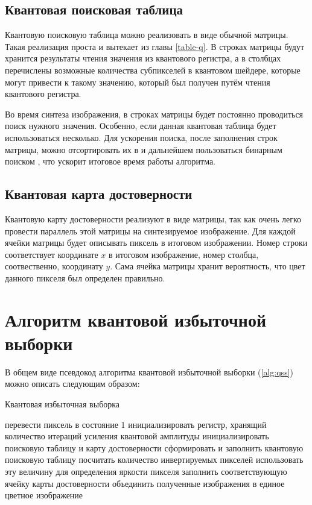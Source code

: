 \subsection{Квантовая поисковая таблица}

Квантовую поисковую таблица можно реализовать в виде обычной матрицы. Такая реализация проста и вытекает из главы \ref{table-q}. В строках матрицы будут хранится результаты чтения значения из квантового регистра, а в столбцах перечислены возможные количества субпикселей в квантовом шейдере, которые могут привести к такому значению, который был получен путём чтения квантового регистра. 

Во время синтеза изображения, в строках матрицы будет постоянно проводиться поиск нужного значения. Особенно, если данная квантовая таблица будет использоваться несколько. Для ускорения поиска, после заполнения строк матрицы, можно отсортировать их в и дальнейшем пользоваться бинарным поиском \cite{binary-search}, что ускорит итоговое время работы алгоритма.

\subsection{Квантовая карта достоверности}

Квантовую карту достоверности реализуют в виде матрицы, так как очень легко провести параллель этой матрицы на синтезируемое изображение. Для каждой ячейки матрицы будет описывать пиксель в итоговом изображении. Номер строки соответствует координате $x$ в итоговом изображение, номер столбца, соотвественно, координату $y$. Сама ячейка матрицы хранит вероятность, что цвет данного пикселя был определен правильно.

\section{Алгоритм квантовой избыточной выборки}\label{qss-algo}

В общем виде псевдокод алгоритма квантовой избыточной выборки (\ref{alg:qss}) можно описать следующим образом:

\begin{algorithm}
	\caption{Квантовая избыточная выборка}
	\label{alg:qss}
	\begin{algorithmic}[1]
				\State перевести пиксель в состояние 1
			\EndFor
			\State инициализировать регистр, хранящий количество итераций усиления квантовой амплитуды
			\State инициализировать поисковую таблицу и карту достоверности
			\State сформировать и заполнить квантовую поисковую таблицу
				\State посчитать количество инвертируемых пикселей 
				\State использовать эту величину для определения яркости пикселя
				\State заполнить соответствующую ячейку карты достоверности
			\EndFor
		\EndFor
		\State объединить полученные изображения в единое цветное изображение
	\end{algorithmic}
\end{algorithm}

